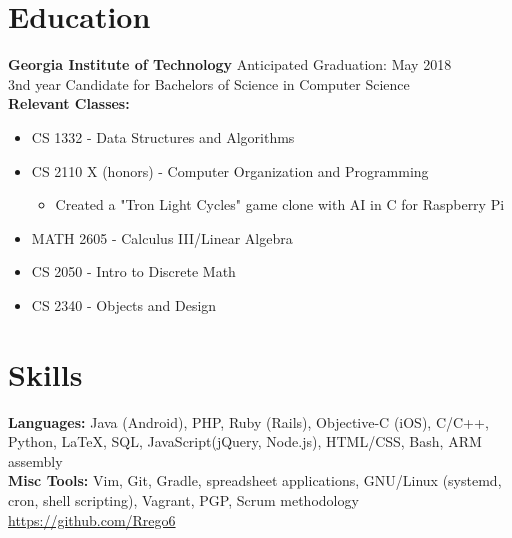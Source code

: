 \documentclass[line, margin]{res}
\begin{document}

\address{402 Roberts Way \\ Rincon, GA 31326 \\ (912) 346 6060\\ \href{mailto:rrego@gatech.edu}{\textbf{rrego@gatech.edu}}}

\begin{resume}

\section{Education}
\textbf{Georgia Institute of Technology} \hfill Anticipated Graduation: May 2018 \\
3nd year Candidate for Bachelors of Science in Computer Science \\
\textbf{Relevant Classes:}
\begin{itemize}
	\item CS 1332 - Data Structures and Algorithms
	\item CS 2110 X (honors) - Computer Organization and Programming
		\begin{itemize}
			\item Created a "Tron Light Cycles" game clone with AI in C for Raspberry Pi
		\end{itemize}
	\item MATH 2605 - Calculus III/Linear Algebra
	\item CS 2050 - Intro to Discrete Math
	\item CS 2340 - Objects and Design
\end{itemize}


\section{Skills}
\textbf{Languages:} Java (Android), PHP, Ruby (Rails), Objective-C (iOS), C/C++, Python, LaTeX, SQL, JavaScript(jQuery, Node.js), HTML/CSS, Bash, ARM assembly \\
\textbf{Misc Tools:} Vim, Git, Gradle, spreadsheet applications, GNU/Linux (systemd, cron, shell scripting), Vagrant, PGP, Scrum methodology\\
\url{https://github.com/Rrego6}


\end{resume}
\end{document}
